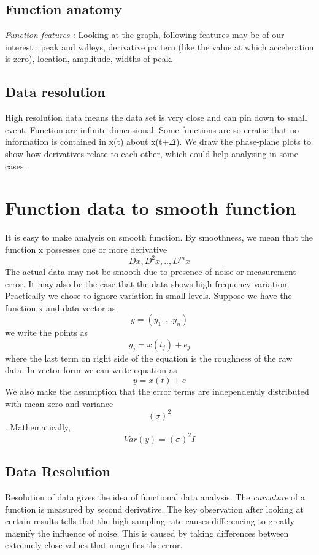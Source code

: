 \documentclass{article}
\begin{document}
\subsection{Function anatomy}
\textit{Function features : }
Looking at the graph, following features may be of our interest : peak and valleys, derivative pattern (like the value at which acceleration is zero), location, amplitude, widths of peak.
\subsection{Data resolution}
High resolution data means the data set is very close and can pin down to small event. Function are infinite dimensional. Some functions are so erratic that no information is contained in x(t) about x(t+$\Delta$). \newline
We draw the phase-plane plots to show how derivatives relate to each other, which could help analysing in some cases.

\section{Function data to smooth function}
It is easy to make analysis on smooth function. By smoothness, we mean that the function x possesses one or more derivative \[Dx,D^2 x,..,D^m x \] The actual data may not be smooth due to presence of noise or measurement error. It may also be the case that the data shows high frequency variation. Practically we chose to ignore variation in small levels.\newline
Suppose we have the function x and data vector as \[ y = (y_1,...y_n) \]
we write the points as \[ y_j = x(t_j) + e_j \]     
where the last term on right side of the equation is the roughness of the raw data. In vector form we can write equation as \[ y = x(t) + e \] We also make the assumption that the error terms are independently distributed with mean zero and variance \[(\sigma)^2 \]. Mathematically, \[Var(y)=(\sigma)^2 I\]

\subsection{Data Resolution}
Resolution of data gives the idea of functional data analysis. The \textit{curvature} of a function is measured by second derivative. The key observation after looking at certain results tells that the high sampling rate causes differencing to greatly magnify the influence of noise. This is caused by taking differences between extremely close values that magnifies the error.
\end{document}

